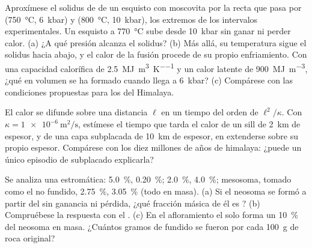 \begin{exercise}[$\star\star\star$]\label{exo:b2:crustal-melting:10}
Aproxímese el solidus de  de un esquisto con moscovita por la recta que pasa
por (\qty{750}{\celsius}, \qty{6}{kbar}) y (\qty{800}{\celsius}, \qty{10}{kbar}),
los extremos de los intervalos experimentales. Un esquisto a \qty{770}{\celsius} sube desde
\qty{10}{kbar} sin ganar ni perder calor. (a) ¿A qué presión alcanza el
solidus? (b) Más allá, su temperatura sigue el solidus hacia abajo, y el calor de la fusión procede
de su propio enfriamiento. Con una capacidad calorífica de \qty{2.5}{\mega\joule\per\cubic\metre\per\kelvin}
y un calor latente de \qty{900}{\mega\joule\per\cubic\metre}, ¿qué  en volumen
se ha formado cuando llega a \qty{6}{kbar}? (c) Compárese con las condiciones propuestas para los
 del Himalaya.
\end{exercise}

\begin{exercise}[$\star\star\star$]\label{exo:b2:crustal-melting:11}
El calor se difunde sobre una distancia $\ell$ en un tiempo del orden de $\ell^2/\kappa$. Con
$\kappa = \qty{1e-6}{\square\metre\per\second}$, estímese el tiempo que tarda el calor de un
sill de \qty{2}{km} de espesor, y de una capa subplacada de \qty{10}{km} de espesor, en extenderse sobre su
propio espesor. Compárese con los diez millones de años de  himalaya: ¿puede un único
episodio de subplacado explicarla?
\end{exercise}

\begin{exercise}[$\star\star\star$]\label{exo:b2:crustal-melting:12}
Se analiza una  estromática:   \qty{5.0}{\percent}, 
\qty{0.20}{\percent};   \qty{2.0}{\percent}, 
\qty{4.0}{\percent}; mesosoma, tomado como el  no fundido, 
\qty{2.75}{\percent},  \qty{3.05}{\percent} (todo en masa). (a) Si el
neosoma se formó a partir del  sin ganancia ni pérdida, ¿qué fracción másica de él es
? (b) Compruébese la respuesta con el . (c) En el afloramiento el  solo forma un
\qty{10}{\percent} del neosoma en masa. ¿Cuántos gramos de fundido se fueron por cada
\qty{100}{\gram} de roca original?
\end{exercise}

